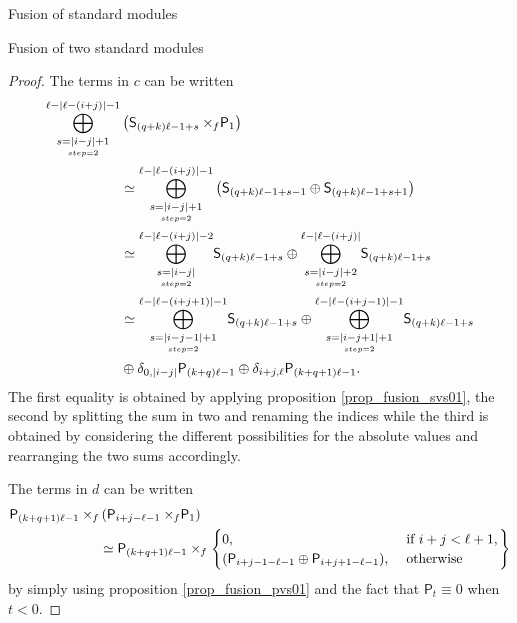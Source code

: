 \documentclass[reqno]{amsart}
\newcommand{\ds}[1]{\mathsf S_{#1}}
\newcommand{\dP}[1]{\mathsf P_{#1}}
\newcommand{\xf}{\times\hspace{-0.27em}_f}
\newcommand{\lc}{\ell}
\begin{document}
\begin{section}{Fusion of standard modules}
\begin{subsection}{Fusion of two standard modules}
\begin{proof}
The terms in $c$ can be written
\begin{align}
	\overset{\lc -|\lc-(i+j)|-1}{\underset{\underset{step =2}{s = |i-j|+1}}{\bigoplus}}&\left(\ds{(q+k) \lc -1 + s}\xf \dP{1} \right) \notag\\
	& \simeq \overset{\lc -|\lc-(i+j)|-1}{\underset{\underset{step =2}{s = |i-j|+1}}{\bigoplus}}\left(
	\ds{(q+k)\lc -1 + s -1} \oplus \ds{(q+k)\lc -1 + s+1}\right) \notag\\
	& \simeq \overset{\lc -|\lc-(i+j)|-2}{\underset{\underset{step =2}{s = |i-j|}}{\bigoplus}}\ds{(q+k) \lc -1 + s} \oplus  \overset{\lc -|\lc-(i+j)|}{\underset{\underset{step =2}{s = |i-j|+2}}{\bigoplus}}\ds{(q+k) \lc -1 + s} \notag\\
	& \simeq \overset{\lc -|\lc-(i+j+1)|-1}{\underset{\underset{step =2}{s = |i-j-1|+1}}{\bigoplus}}\ds{(q+k) \lc -1 + s} \oplus \overset{\lc -|\lc-(i+j-1)|-1}{\underset{\underset{step =2}{s = |i-j+1|+1}}{\bigoplus}}\ds{(q+k) \lc -1 + s} \notag\\
	& \oplus \delta_{0,|i-j|} \dP{(k+q)\lc -1} \oplus \delta_{i+j, \lc} \dP{(k+q+1)\lc -1}.
\end{align}
The first equality is obtained by applying proposition \ref{prop_fusion_svs01}, the second by splitting the sum in two and renaming the indices while the third is obtained by considering the different possibilities for the absolute values and rearranging the two sums accordingly.

The terms in $d$ can be written
\begin{align}
	\dP{(k+q+1)\lc -1} \xf & \left(\dP{i+j - \lc -1}\xf \dP{1} \right) \notag\\
	& \simeq \dP{(k+q+1)\lc -1} \xf \left. \begin{cases}
	0,& \text{ if } i+j < \lc +1,\\
	(\dP{i+j-1 - \lc -1} \oplus \dP{i+j+1 - \lc -1}	), & \text{ otherwise}
	\end{cases}\right\rbrace
\end{align}
by simply using proposition \ref{prop_fusion_pvs01} and the fact that $\dP{t} \equiv 0$ when $t <0$.


\end{proof}
\end{subsection}
\end{section}
\end{document}
